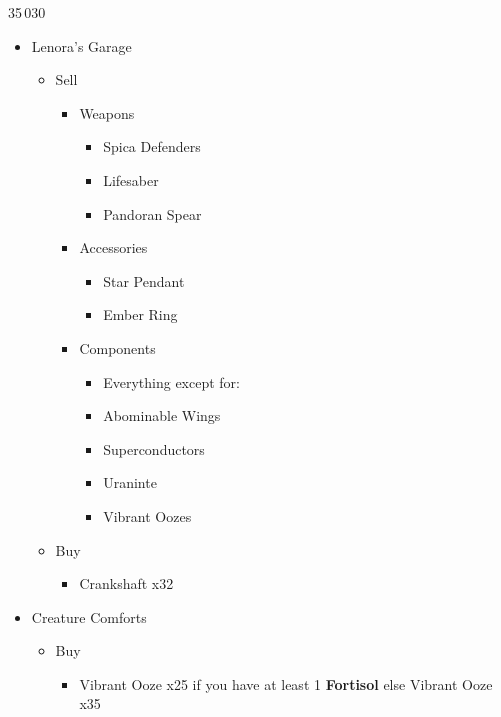 \documentclass{report}
\begin{document}
\begin{shop}{35\,030}
\begin{itemize}
    \item Lenora's Garage
    \begin{itemize}
        \item Sell
        \begin{itemize}
            \item Weapons
            \begin{itemize}
                \item Spica Defenders
                \item Lifesaber
                \item Pandoran Spear
            \end{itemize}
            \item Accessories
            \begin{itemize}
                \item Star Pendant
                \item Ember Ring
            \end{itemize}
            \item Components
            \begin{itemize}
                \item Everything except for:
                \item Abominable Wings
                \item Superconductors
                \item Uraninte
                \item Vibrant Oozes
            \end{itemize}
        \end{itemize}
        \item Buy
        \begin{itemize}
            \item Crankshaft x32
        \end{itemize}
    \end{itemize}
    \item Creature Comforts
    \begin{itemize}
        \item Buy
        \begin{itemize}
            \item Vibrant Ooze x25 if you have at least 1 \textbf{Fortisol} else Vibrant Ooze x35
        \end{itemize}
    \end{itemize}

\end{itemize}
\end{shop}
\end{document}
